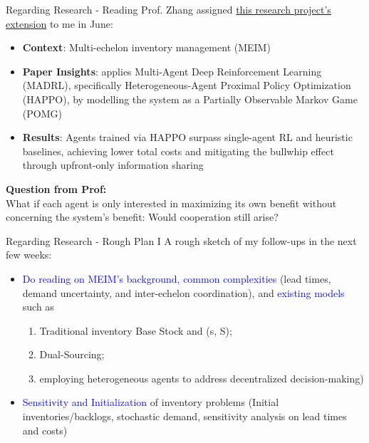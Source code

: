 \documentclass[xcolor=dvipsnames]{beamer}
\begin{document}
\begin{frame}{Regarding Research - Reading}
    Prof. Zhang assigned 
    \textcolor{cyan}{\href{https://papers.ssrn.com/sol3/papers.cfm?abstract_id=4262186}{this research project's extension}} to me in June:
    \begin{itemize}
    \item \textbf{Context}: Multi-echelon inventory management (MEIM)
    \item \textbf{Paper Insights}: applies Multi-Agent Deep Reinforcement Learning (MADRL), 
        specifically Heterogeneous-Agent Proximal Policy Optimization (HAPPO),
        by modelling the system as a Partially Observable Markov Game (POMG)
    \item \textbf{Results}: Agents trained via HAPPO surpass single-agent RL and heuristic baselines, 
        achieving lower total costs and mitigating the bullwhip effect through upfront-only information sharing
    \end{itemize}

    \begin{defbox}
        \textbf{Question from Prof:}
        \\What if each agent is only interested in maximizing its own benefit without concerning the system’s benefit:
        Would cooperation still arise?
    \end{defbox}
\end{frame}

\begin{frame}{Regarding Research - Rough Plan I}
    A rough sketch of my follow-ups in the next few weeks:
    \begin{itemize}
    \item \textcolor{blue}{Do reading on MEIM's background, common complexities} 
        (lead times, demand uncertainty, and inter-echelon coordination),
        and \textcolor{blue}{existing models} such as 
        \begin{enumerate}
        \item Traditional inventory Base Stock and (s, S); 
        \item Dual-Sourcing;
        \item employing heterogeneous agents to address decentralized decision-making)
        \end{enumerate}
    \item \textcolor{blue}{Sensitivity and Initialization} of inventory problems (Initial inventories/backlogs, stochastic demand, 
        sensitivity analysis on lead times and costs)
    \end{itemize}
\end{frame}
\end{document}
